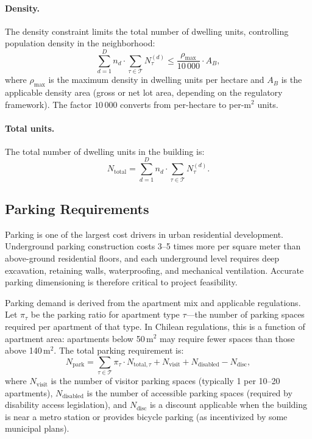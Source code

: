 \documentclass[11pt,a4paper]{article}
\newcommand{\calT}{\mathcal{T}}
\begin{document}
\paragraph{Density.}
The density constraint limits the total number of dwelling units,
controlling population density in the neighborhood:
\begin{equation}\label{eq:density}
    \sum_{d=1}^{D} n_d \cdot \sum_{\tau \in \calT} N_\tau^{(d)} \leq \frac{\rho_{\max}}{10\,000} \cdot A_B,
\end{equation}
where $\rho_{\max}$ is the maximum density in dwelling units per
hectare and $A_B$ is the applicable density area (gross or net lot
area, depending on the regulatory framework). The factor
$10\,000$ converts from per-hectare to per-m$^2$ units.

\paragraph{Total units.}
The total number of dwelling units in the building is:
\begin{equation}
    N_{\text{total}} = \sum_{d=1}^{D} n_d \cdot \sum_{\tau \in \calT} N_\tau^{(d)}.
\end{equation}

\subsection{Parking Requirements}

Parking is one of the largest cost drivers in urban residential
development. Underground parking construction costs 3--5 times more
per square meter than above-ground residential floors, and each
underground level requires deep excavation, retaining walls, waterproofing,
and mechanical ventilation. Accurate parking dimensioning is therefore
critical to project feasibility.

Parking demand is derived from the apartment mix and applicable
regulations. Let $\pi_\tau$ be the parking ratio for apartment type
$\tau$---the number of parking spaces required per apartment of that
type. In Chilean regulations, this is a function of apartment area:
apartments below 50\,m$^2$ may require fewer spaces than those above
140\,m$^2$. The total parking requirement is:
\begin{equation}
    N_{\text{park}} = \sum_{\tau \in \calT} \pi_\tau \cdot N_{\text{total},\tau} + N_{\text{visit}} + N_{\text{disabled}} - N_{\text{disc}},
\end{equation}
where $N_{\text{visit}}$ is the number of visitor parking spaces
(typically 1 per 10--20 apartments), $N_{\text{disabled}}$ is the
number of accessible parking spaces (required by disability access
legislation), and $N_{\text{disc}}$ is a discount applicable when the
building is near a metro station or provides bicycle parking (as
incentivized by some municipal plans).
\end{document}
